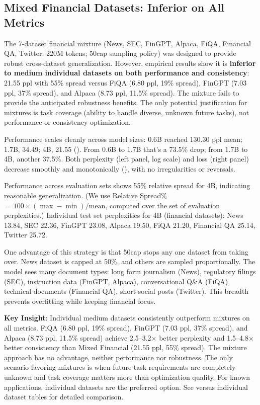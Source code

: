 \subsection{Mixed Financial Datasets: Inferior on All Metrics}

The 7-dataset financial mixture (News, SEC, FinGPT, Alpaca, FiQA, Financial QA, Twitter; 220M tokens; 50cap sampling policy) was designed to provide robust cross-dataset generalization. However, empirical results show it is \textbf{inferior to medium individual datasets on both performance and consistency}: 21.55 ppl with 55\% spread versus FiQA (6.80 ppl, 19\% spread), FinGPT (7.03 ppl, 37\% spread), and Alpaca (8.73 ppl, 11.5\% spread). The mixture fails to provide the anticipated robustness benefits. The only potential justification for mixtures is task coverage (ability to handle diverse, unknown future tasks), not performance or consistency optimization.

Performance scales cleanly across model sizes: 0.6B reached 130.30 ppl mean; 1.7B, 34.49; 4B, 21.55 (). From 0.6B to 1.7B that's a 73.5\% drop; from 1.7B to 4B, another 37.5\%. Both perplexity (left panel, log scale) and loss (right panel) decrease smoothly and monotonically (), with no irregularities or reversals.

Performance across evaluation sets shows 55\% relative spread for 4B, indicating reasonable generalization. (We use Relative Spread\% $=100\times(\max-\min)/\text{mean}$, computed over the set of evaluation perplexities.) Individual test set perplexities for 4B (financial datasets): News 13.84, SEC 22.36, FinGPT 23.08, Alpaca 19.50, FiQA 21.20, Financial QA 25.14, Twitter 25.72.

One advantage of this strategy is that 50cap stops any one dataset from taking over. News dataset is capped at 50\%, and others are sampled proportionally. The model sees many document types: long form journalism (News), regulatory filings (SEC), instruction data (FinGPT, Alpaca), conversational Q\&A (FiQA), technical documents (Financial QA), short social posts (Twitter). This breadth prevents overfitting while keeping financial focus.

\textbf{Key Insight}: Individual medium datasets consistently outperform mixtures on all metrics. FiQA (6.80 ppl, 19\% spread), FinGPT (7.03 ppl, 37\% spread), and Alpaca (8.73 ppl, 11.5\% spread) achieve 2.5–3.2$\times$ better perplexity and 1.5–4.8$\times$ better consistency than Mixed Financial (21.55 ppl, 55\% spread). The mixture approach has no advantage, neither performance nor robustness. The only scenario favoring mixtures is when future task requirements are completely unknown and task coverage matters more than optimization quality. For known applications, individual datasets are the preferred option. See  versus individual dataset tables for detailed comparison.

